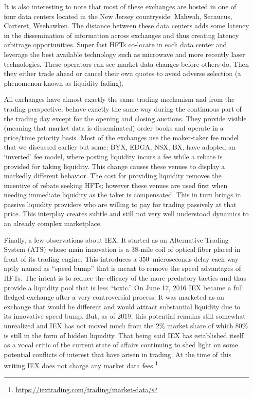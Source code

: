 It is also interesting to note that most of these exchanges are hosted in one of four data centers located in the New Jersey countryside: Mahwah, Secaucus, Carteret, Weehawken. The distance between these data centers adds some latency in the dissemination of information across exchanges and thus creating latency arbitrage opportunities. Super fast HFTs co-locate in each data center and leverage the best available technology such as microwave and more recently laser technologies. These operators can see market data changes before others do. Then they either trade ahead or cancel their own quotes to avoid adverse selection (a phenomenon known as liquidity fading).


All exchanges have almost exactly the same trading mechanism and from the trading perspective, behave exactly the same way during the continuous part of the trading day except for the opening and closing auctions. They provide visible (meaning that market data is disseminated) order books and operate in a price/time priority basis. Most of the exchanges use the maker-taker fee model that we discussed earlier but some: BYX, EDGA, NSX, BX, have adopted an `inverted' fee model, where posting liquidity incurs a fee while a rebate is provided for taking liquidity. This change causes these venues to display a markedly different behavior. The cost for providing liquidity removes the incentive of rebate seeking HFTs; however  these venues are used first when needing immediate liquidity as the taker is compensated. This in turn brings in passive liquidity providers who are willing to pay for trading passively at that price. This interplay creates subtle and still not very well understood dynamics to an already complex marketplace.


Finally, a few observations about IEX. It started as an Alternative Trading System (ATS) whose main innovation is a 38-mile coil of optical fiber placed in front of its trading engine. This introduces a 350~microseconds delay each way aptly named as ``speed bump'' that is meant to remove the speed advantages of HFTs. The intent is to reduce the efficacy of the more predatory tactics and thus provide a liquidity pool that is less ``toxic.'' On June 17, 2016 IEX became a full fledged exchange after a very controversial process. It was marketed as an exchange that would be different and would attract substantial liquidity due to its innovative speed bump. But, as of 2019, this potential remains still somewhat unrealized and IEX has not moved much from the 2\% market share of which 80\% is still in the form of hidden liquidity. That being said IEX has established itself as a vocal critic of the current state of affairs continuing to shed light on some potential conflicts of interest that have arisen in trading. At the time of this writing IEX does not charge any market data fees.\footnote{\url{https://iextrading.com/trading/market-data/}} \twomedskip



